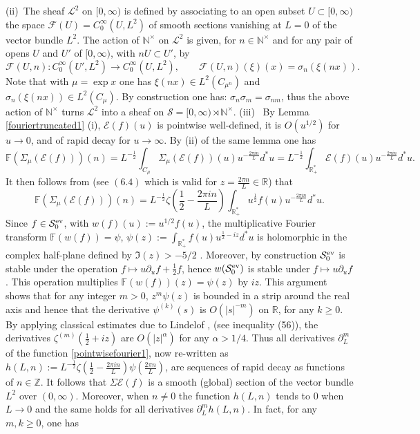\documentclass{pspum-l}
\theoremstyle{definition}
\theoremstyle{remark}
\numberwithin{equation}{section}
\def\F{{\mathbb F}}
\def\R{{\mathbb R}}
\def\Z{{\mathbb Z}}
\def\cE{{\mathcal E}}
\def\cF{{\mathcal F}}
\def\cL{{\mathcal L}}
\def\cS{{\mathcal S}}
\def\fourier{\F}
\def\sr0{{\cS^{\rm ev}_0}}
\def\rnt{{[0,\infty)\rtimes{\N^{\times}}}}
\def\nt{\N^{\times}}
\def\N{{\mathbb N}}
\def\scal2{{\mathscr S}}
\begin{document}
 (ii)~The  sheaf  $\cL^2$ on $[0,\infty)$  is defined by associating to an open subset $U\subset [0,\infty)$ the space  $\cF(U)=C_0^{\infty}(U,L^2)$ of smooth sections vanishing at $L=0$ of the vector bundle $L^2$.  The action of $\nt$ on $\cL^2$ is given, for $n\in \N^\times$ and for any pair of opens $U$ and $U'$ of $[0,
 \infty)$, with $n U\subset U'$, by 
 \begin{equation}\label{F(omega,n)}
\cF(U,n): C_0^{\infty}(U',L^2)\to C_0^{\infty}(U,L^2), \qquad 
\cF(U,n)(\xi)(x)= \sigma_n(\xi(nx)).
 \end{equation}
 Note that with $\mu=\exp x$ one has $\xi(nx)\in L^2(C_{\mu^n})$ and $\sigma_n(\xi(nx))\in L^2(C_\mu)$.
 By construction one has:  $\sigma_n\sigma_m=\sigma_{nm}$,  thus the above action of $\nt$ turns  $\cL^2$  into a sheaf on $\scal2=\rnt$. \newline
 (iii)~ By Lemma \ref{fouriertruncated1} (i), $\cE(f)(u)$ is pointwise well-defined, it is 
$O(u^{1/2})$ for $u\to 0$, and of rapid decay for $u\to\infty$. By (ii) of the same lemma one has 
\[
\fourier(\Sigma_\mu(\cE(f)))(n)=L^{-\frac 12}\int_{C_\mu} \Sigma_\mu(\cE(f))(u)u^{-\frac{2\pi i n}{L}}d^*u =L^{-\frac 12}\int_{\R_+^*} \cE(f)(u)u^{-\frac{2\pi i n}{L}}d^*u. 
\]
It then follows from \cite{ccspectral} (see $(6.4)$  which is valid for $z=\frac{2\pi  n}{L}\in \R$) that  
\begin{equation}\label{pointwisefourier1}
\fourier(\Sigma_\mu(\cE(f)))(n)=L^{-\frac 12}\zeta\left(\frac 12-\frac{2\pi i n}{L}\right)\int_{\R_+^*}u^{\frac 12} f(u)u^{-\frac{2\pi i n}{L}}d^*u.
\end{equation}
Since $f\in \sr0$, with $w(f)(u):=u^{1/2}f(u)$, the multiplicative Fourier transform $\fourier(w(f))=\psi$,
$\psi(z):=\int_{\R_+^*}f(u)u^{\frac 12-iz}d^*u$ is holomorphic in the complex half-plane defined by $\Im(z)>-5/2$ \cite{ccspectral}. Moreover, by construction $\sr0$ is stable under the operation $f\mapsto u\partial_u f+\frac 12 f$,  hence $w(\sr0)$ is stable under $f\mapsto u\partial_uf$. This operation  multiplies $\fourier(w(f))(z)=\psi(z)$ by $iz$. This argument shows that for any integer $m>0$, $z^m\psi(z)$ is bounded in a strip around the real axis and hence that  the  derivative $\psi^{(k)}(s)$ is $O(\vert s\vert^{-m})$ on $\R$, for any $k\geq 0$. By applying classical estimates  due to Lindelof \cite{lindelof}, (see \cite{backlund} inequality (56)), the derivatives  $\zeta^{(m)}(\frac 12+iz)$ are $O(\vert z\vert^ \alpha)$ for any $\alpha>1/4$. Thus all derivatives $\partial_L^m$ of the function \eqref{pointwisefourier1}, now re-written as $h(L,n):=L^{-\frac 12}\zeta\left(\frac 12-\frac{2\pi i n}{L}\right)\psi(\frac{2\pi n}{L})$, are sequences of rapid decay as functions of $n\in \Z$.   It follows that $\Sigma\cE(f)$ is a smooth (global) section of the vector bundle $L^2$ over $(0,\infty)$. Moreover, when $n\neq 0$ the function $h(L,n)$ tends to $0$ when $L\to 0$ and the same holds for all derivatives $\partial_L^m h(L,n)$. In fact, for any $m, k\geq 0$,  one has 
\end{document}

